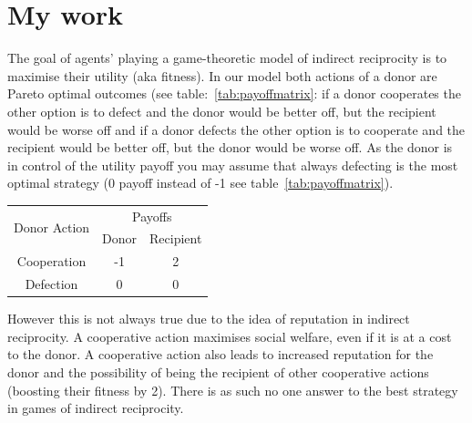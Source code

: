 \documentclass[]{final_report}
\begin{document}
\chapter{My work}
The goal of agents' playing a game-theoretic model of indirect reciprocity is to maximise their utility (aka fitness). In our model both actions of a donor are Pareto optimal outcomes (see table:~\ref{tab:payoffmatrix}: if a donor cooperates the other option is to defect and the donor would be better off, but the recipient would be worse off and if a donor defects the other option is to cooperate and the recipient would be better off, but the donor would be worse off. As the donor is in control of the utility payoff you may assume that always defecting is the most optimal strategy (0 payoff instead of -1 see table~\ref{tab:payoffmatrix}).
\begin{framed}
	\begin{center}
		\label{tab:payoffmatrix}
		\begin{tabular}{c|c|c}
		\multirow{2}{*}{Donor Action} & \multicolumn{2}{c}{Payoffs}\\		
		& Donor & Recipient\\
		\hline
		Cooperation & -1 & 2\\
		\hline
		Defection & 0 & 0\\
		\end{tabular}
	\end{center}	
\end{framed}
However this is not always true due to the idea of reputation in indirect reciprocity. A cooperative action maximises social welfare, even if it is at a cost to the donor. A cooperative action also leads to increased reputation for the donor and the possibility of being the recipient of other cooperative actions (boosting their fitness by 2). There is as such no one answer to the best strategy in games of indirect reciprocity.\\
\end{document}
